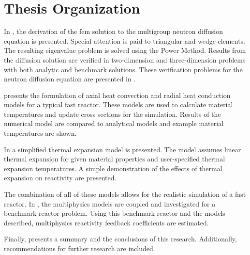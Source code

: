 \section{Thesis Organization}
  In , the derivation of the \gls{fem} solution to
  the multigroup neutron diffusion equation is presented. Special attention is
  paid to triangular and wedge elements. The resulting eigenvalue problem is
  solved using the Power Method. Results from the diffusion solution are
  verified in two-dimension and three-dimension problems with both analytic and
  benchmark solutions. These verification problems for the neutron diffusion
  equation are presented in .

   presents the formulation of axial heat convection
  and radial heat conduction models for a typical fast reactor. These models are 
  used to calculate material temperatures and update cross sections for the 
  simulation. Results of the numerical model are compared to analytical models 
  and example material temperatures are shown.

  In  a simplified thermal expansion model is
  presented. The model assumes linear thermal expansion for given material
  properties and user-specified thermal expansion temperatures. A simple
  demonstration of the effects of thermal expansion on reactivity are presented.

  The combination of all of these models allows for the realistic simulation of
  a fast reactor. In , the multiphysics models are
  coupled and investigated for a benchmark reactor problem. Using this benchmark
  reactor and the models described, multiphysics reactivity feedback
  coefficients are estimated.
 
  Finally,  presents a summary and the conclusions of this
  research. Additionally, recommendations for further research are included.
